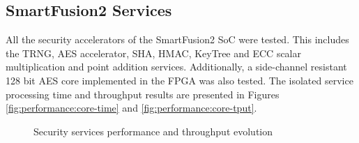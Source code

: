 \subsection{SmartFusion2 Services}\label{chap:evaluation:board}

All the security accelerators of the SmartFusion2 SoC were tested. This includes the TRNG, AES accelerator, SHA, HMAC, KeyTree and ECC scalar multiplication and point addition services.
Additionally, a side-channel resistant 128 bit AES core implemented in the FPGA was also tested.
The isolated service processing time and throughput results are presented in Figures \ref{fig:performance:core-time} and \ref{fig:performance:core-tput}.
\begin{figure}[h!]
	\centering     %
	\caption{Security services performance and throughput evolution}
\end{figure}

